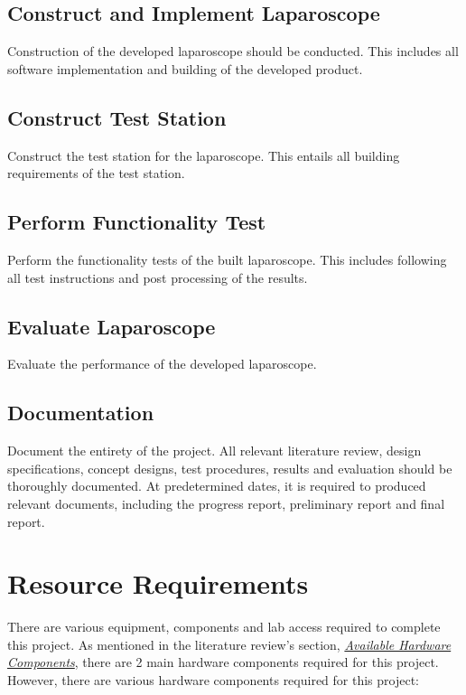 \subsection{Construct and Implement Laparoscope}

Construction of the developed laparoscope should be conducted. This includes all software implementation and building of the developed product.

\subsection{Construct Test Station}

Construct the test station for the laparoscope. This entails all building requirements of the test station.

\subsection{Perform Functionality Test}

Perform the functionality tests of the built laparoscope. This includes following all test instructions and post processing of the results.

\subsection{Evaluate Laparoscope}

Evaluate the performance of the developed laparoscope. 

\subsection{Documentation}

Document the entirety of the project. All relevant literature review, design specifications, concept designs, test procedures, results and evaluation should be thoroughly documented. At predetermined dates, it is required to produced relevant documents, including the progress report, preliminary report and final report. 

\section{Resource Requirements} 

There are various equipment, components and lab access required to complete this project. As mentioned in the literature review's section, \textit{\hyperref[sec:Available Hardware Components]{Available Hardware Components}}, there are 2 main hardware components required for this project. However, there are various hardware components required for this project:

